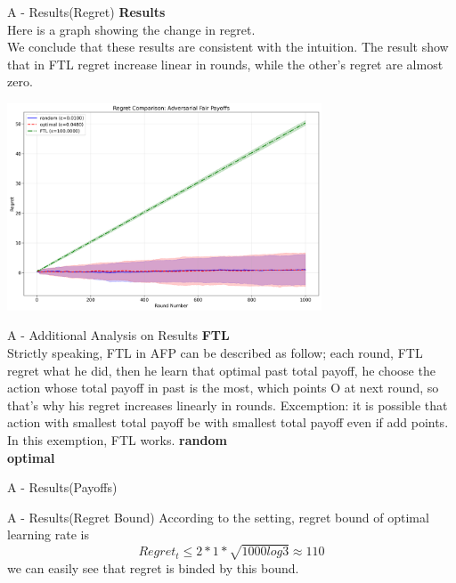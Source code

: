 \documentclass{beamer}
\begin{document}
\begin{frame}{A - Results(Regret)}
\textbf{Results}\\
Here is a graph showing the change in regret. \\
We conclude that these results are consistent with the intuition. The result show that in FTL regret increase linear in rounds, while the other's regret are almost zero.
\begin{center}
    \includegraphics[width=0.7\textwidth]{332Project2/figures/adversarial_regret_comparison.png}
\end{center}
\end{frame}


\begin{frame}{A - Additional Analysis on Results}
\textbf{FTL}\\
Strictly speaking, FTL in AFP can be described as follow; 
each round, FTL regret what he did, then he learn that optimal past total payoff, he choose the action whose total payoff in past is the most, which points O at next round, so that's why his regret increases linearly in rounds.
Excemption: it is possible that action with smallest total payoff be with smallest total payoff even if add points. In this exemption, FTL works.
\textbf{random}\\

\textbf{optimal}\\

\end{frame}

\begin{frame}{A - Results(Payoffs)}



\end{frame}

\begin{frame}{A - Results(Regret Bound)}
    According to the setting, regret bound of optimal learning rate is
    \[
    Regret_t \leq 2 * 1 * \sqrt{1000log3} \approx 110
    \]
    we can easily see that regret is binded by this bound.
\end{frame}
\end{document}
